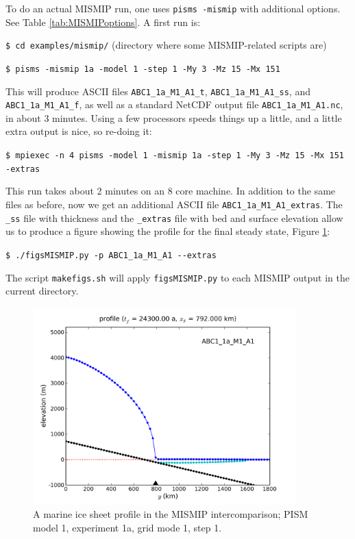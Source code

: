 \documentclass[11pt,final]{amsart}
\begin{document}
To do an actual MISMIP run, one uses \verb|pisms -mismip| with additional options.  See Table \ref{tab:MISMIPoptions}.  A first run is:

\verb|$ cd examples/mismip/|  \hfill \scriptsize(directory where some MISMIP-related scripts are)\normalsize

\verb|$ pisms -mismip 1a -model 1 -step 1 -My 3 -Mz 15 -Mx 151|

\noindent This will produce ASCII files \verb|ABC1_1a_M1_A1_t|, \verb|ABC1_1a_M1_A1_ss|, and \verb|ABC1_1a_M1_A1_f|, as well as a standard NetCDF output file \verb|ABC1_1a_M1_A1.nc|, in about 3 minutes.  Using a few processors speeds things up a little, and a little extra output is nice, so re-doing it:

\verb|$ mpiexec -n 4 pisms -model 1 -mismip 1a -step 1 -My 3 -Mz 15 -Mx 151 -extras|

\noindent This run takes about 2 minutes on an 8 core machine.  In addition to the same files as before, now we get an additional ASCII file \verb|ABC1_1a_M1_A1_extras|.  The \verb|_ss| file with thickness and the \verb|_extras| file with bed and surface elevation allow us to produce a figure showing the profile for the final steady state, Figure \ref{fig:MISMIPmodel1exper1aM1A1}:

\verb|$ ./figsMISMIP.py -p ABC1_1a_M1_A1 --extras|

\noindent The script \verb|makefigs.sh| will apply \verb|figsMISMIP.py| to each MISMIP output in the current directory.

\begin{figure}[ht]
\includegraphics[width=4.0in,keepaspectratio=true]{profile_EBU1_1a_M1_A1}
\caption{A marine ice sheet profile in the MISMIP intercomparison; PISM model 1, experiment 1a, grid mode 1, step 1.}
\label{fig:MISMIPmodel1exper1aM1A1}
\end{figure}
\end{document}
